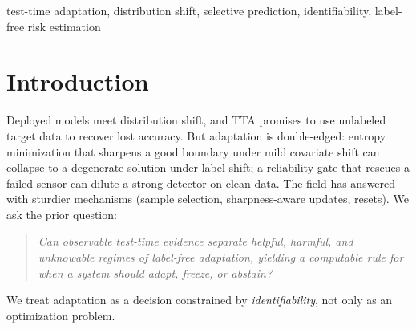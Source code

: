 \documentclass[conference]{IEEEtran}
\theoremstyle{plain}
\theoremstyle{definition}
\begin{document}
\begin{abstract}
is near-best in both, giving the highest mean accuracy across regimes ($0.490$ vs $0.456$/$0.444$).
On a \emph{pre-registered} CIFAR-10-C stress grid (severity$\times$batch$\times$composition$\times$aggressiveness;
harmful base rate $0.16$--$0.34$), \textsc{KGA} \emph{beats both} trivial policies for Tent and EATA---regret-to-oracle
$0.0016$ vs always-adapt $0.009$ and always-freeze $0.12$, at a $0\%$ false-adapt rate---and ties the collapse-resistant SAR.
We are explicit about scope: where harmful adaptation is mild, always-adapt is
already strong, so the certificate's distinctive value is bounded by how often
\emph{catastrophic, detectable} harm occurs---itself the quantity the theory characterizes.
\end{abstract}

\begin{IEEEkeywords}
test-time adaptation, distribution shift, selective prediction, identifiability, label-free risk estimation
\end{IEEEkeywords}

\begin{center}\end{center}

\section{Introduction}\label{sec:intro}
Deployed models meet distribution shift, and TTA promises to use unlabeled target data
to recover lost accuracy. But adaptation is double-edged: entropy minimization that
sharpens a good boundary under mild covariate shift can collapse to a degenerate
solution under label shift; a reliability gate that rescues a failed sensor can dilute
a strong detector on clean data. The field has answered with sturdier mechanisms
(sample selection, sharpness-aware updates, resets). We ask the prior question:
\begin{quote}\emph{Can observable test-time evidence separate helpful, harmful, and
unknowable regimes of label-free adaptation, yielding a computable rule for when a
system should adapt, freeze, or abstain?}\end{quote}
We treat adaptation as a decision constrained by \emph{identifiability}, not only as an
optimization problem.
\end{document}
